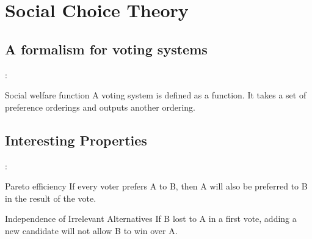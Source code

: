 \documentclass[utf8]{earlywinter}
\begin{document}
\section{Social Choice Theory}
\subsection{A formalism for voting systems}
\begin{frame}{\secname: \subsecname}


%
%
%
  \begin{block}{Social welfare function}
    A voting system is defined as a function. It takes a set of preference orderings and outputs another ordering.
  \end{block}
 


\end{frame}

\subsection{Interesting Properties}
\begin{frame}{\secname: \subsecname}

  \begin{block}{Pareto efficiency}
    {If every voter prefers A to B, then A will also be preferred to B in the result of the vote.}
  \end{block}


  \begin{block}{Independence of Irrelevant Alternatives}
    {If B lost to A in a first vote, adding a new candidate will not allow B to win over A.}
  \end{block}
\end{frame}
\end{document}

